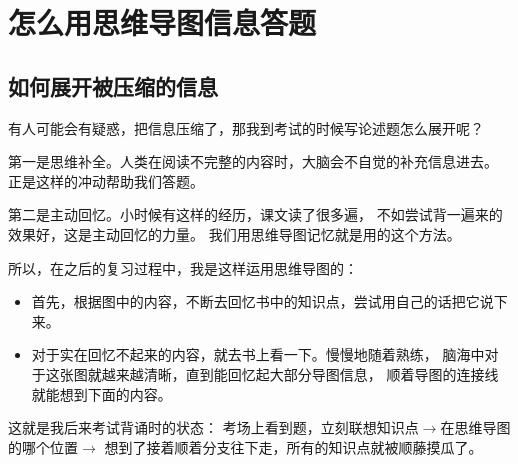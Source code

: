 \documentclass[../main.tex]{subfiles}
\begin{document}
\section{怎么用思维导图信息答题}
\begin{cuenotes}
\end{cuenotes}
%
\subsection{如何展开被压缩的信息}
有人可能会有疑惑，把信息压缩了，那我到考试的时候写论述题怎么展开呢？

第一是思维补全。人类在阅读不完整的内容时，大脑会不自觉的补充信息进去。
正是这样的冲动帮助我们答题。

第二是主动回忆。小时候有这样的经历，课文读了很多遍，
不如尝试背一遍来的效果好，这是主动回忆的力量。
我们用思维导图记忆就是用的这个方法。

所以，在之后的复习过程中，我是这样运用思维导图的：
\begin{itemize}
  \item 首先，根据图中的内容，不断去回忆书中的知识点，尝试用自己的话把它说下来。
  \item 对于实在回忆不起来的内容，就去书上看一下。慢慢地随着熟练，
    脑海中对于这张图就越来越清晰，直到能回忆起大部分导图信息，
    顺着导图的连接线就能想到下面的内容。
\end{itemize}

这就是我后来考试背诵时的状态：
考场上看到题，立刻联想知识点$\rightarrow$在思维导图的哪个位置$\rightarrow$
想到了接着顺着分支往下走，所有的知识点就被顺藤摸瓜了。
%
\end{document}
